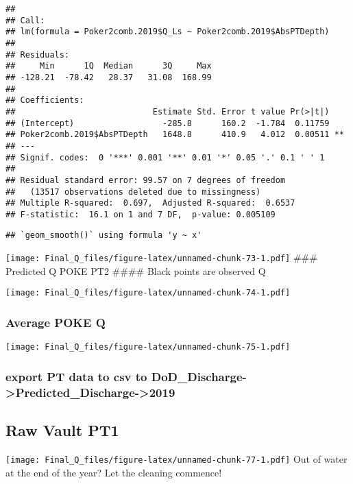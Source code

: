 \documentclass[
]{article}
\begin{document}
\begin{verbatim}
## 
## Call:
## lm(formula = Poker2comb.2019$Q_Ls ~ Poker2comb.2019$AbsPTDepth)
## 
## Residuals:
##     Min      1Q  Median      3Q     Max 
## -128.21  -78.42   28.37   31.08  168.99 
## 
## Coefficients:
##                            Estimate Std. Error t value Pr(>|t|)   
## (Intercept)                  -285.8      160.2  -1.784  0.11759   
## Poker2comb.2019$AbsPTDepth   1648.8      410.9   4.012  0.00511 **
## ---
## Signif. codes:  0 '***' 0.001 '**' 0.01 '*' 0.05 '.' 0.1 ' ' 1
## 
## Residual standard error: 99.57 on 7 degrees of freedom
##   (13517 observations deleted due to missingness)
## Multiple R-squared:  0.697,  Adjusted R-squared:  0.6537 
## F-statistic:  16.1 on 1 and 7 DF,  p-value: 0.005109
\end{verbatim}

\begin{verbatim}
## `geom_smooth()` using formula 'y ~ x'
\end{verbatim}

\texttt{[image: Final\_Q\_files/figure-latex/unnamed-chunk-73-1.pdf]}
\#\#\# Predicted Q POKE PT2 \#\#\#\# Black points are observed Q

\texttt{[image: Final\_Q\_files/figure-latex/unnamed-chunk-74-1.pdf]}

\hypertarget{average-poke-q}{%
\subsubsection{Average POKE Q}\label{average-poke-q}}

\texttt{[image: Final\_Q\_files/figure-latex/unnamed-chunk-75-1.pdf]}

\hypertarget{export-pt-data-to-csv-to-dod_discharge-predicted_discharge-2019-2}{%
\subsubsection{export PT data to csv to
DoD\_Discharge-\textgreater Predicted\_Discharge-\textgreater2019}\label{export-pt-data-to-csv-to-dod_discharge-predicted_discharge-2019-2}}

\hypertarget{raw-vault-pt1}{%
\subsection{Raw Vault PT1}\label{raw-vault-pt1}}

\texttt{[image: Final\_Q\_files/figure-latex/unnamed-chunk-77-1.pdf]} Out
of water at the end of the year? Let the cleaning commence!
\end{document}
